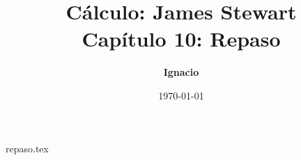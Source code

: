 \documentclass[11pt,spanish,oneside]{report}
\title{\textbf{Cálculo: James Stewart} \\ \Large Capítulo 10: Repaso}
\author{\textbf{Ignacio}}
\date{\today}
\begin{document}
\maketitle

{repaso.tex}
\end{document}
